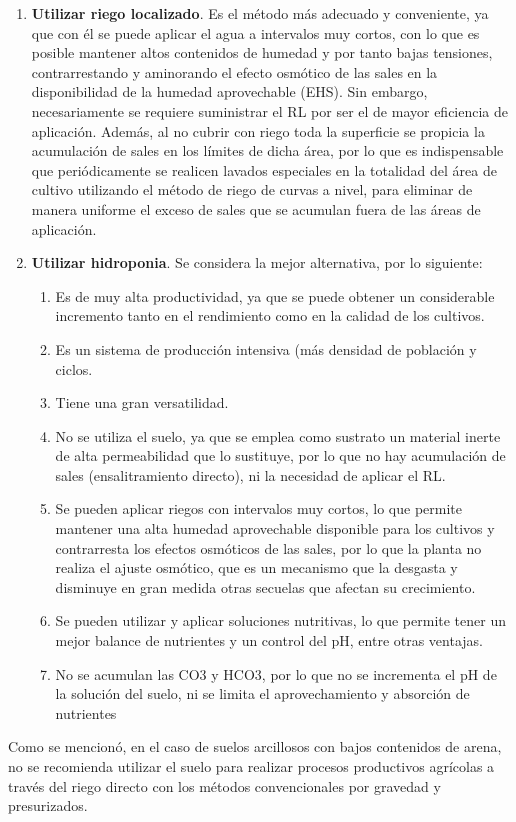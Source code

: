 \begin{enumerate}
    \item \textbf{Utilizar riego localizado}. Es el método más adecuado y conveniente, ya que con él se puede aplicar el agua a intervalos muy cortos, con lo que es posible mantener altos contenidos de humedad y por tanto bajas tensiones, contrarrestando y aminorando el efecto osmótico de las sales en la disponibilidad de la humedad aprovechable (EHS). Sin embargo, necesariamente se requiere suministrar el RL por ser el de mayor eficiencia de aplicación. Además, al no cubrir con riego toda la superficie se propicia la acumulación de sales en los límites de dicha área, por lo que es indispensable que periódicamente se realicen lavados especiales en la totalidad del área de cultivo utilizando el método de riego de curvas a nivel, para eliminar de manera uniforme el exceso de sales que se acumulan fuera de las áreas de aplicación.
    \item \textbf{Utilizar hidroponia}. Se considera la mejor alternativa, por lo siguiente:
    \begin{enumerate}
        \item Es de muy alta productividad, ya que se puede obtener un considerable incremento tanto en el rendimiento como en la calidad de los cultivos.
        \item Es un sistema de producción intensiva (más densidad de población y ciclos.
        \item Tiene una gran versatilidad.
        \item No se utiliza el suelo, ya que se emplea como sustrato un material inerte de alta permeabilidad que lo sustituye, por lo que no hay acumulación de sales (ensalitramiento directo), ni la necesidad de aplicar el RL.
        \item Se pueden aplicar riegos con intervalos muy cortos, lo que permite mantener una alta humedad aprovechable disponible para los cultivos y contrarresta los efectos osmóticos de las sales, por lo que la planta no realiza el ajuste osmótico, que es un mecanismo que la desgasta y disminuye en gran medida otras secuelas que afectan su crecimiento.
        \item Se pueden utilizar y aplicar soluciones nutritivas, lo que permite tener un mejor balance de nutrientes y un control del pH, entre otras ventajas.
        \item No se acumulan las CO3 y HCO3, por lo que no se incrementa el pH de la solución del suelo, ni se limita el aprovechamiento y absorción de nutrientes    
    \end{enumerate}
\end{enumerate}
Como se mencionó, en el caso de suelos arcillosos con bajos contenidos de arena, no se recomienda utilizar el suelo para realizar procesos productivos agrícolas a través del riego directo con los métodos convencionales por gravedad y presurizados.

